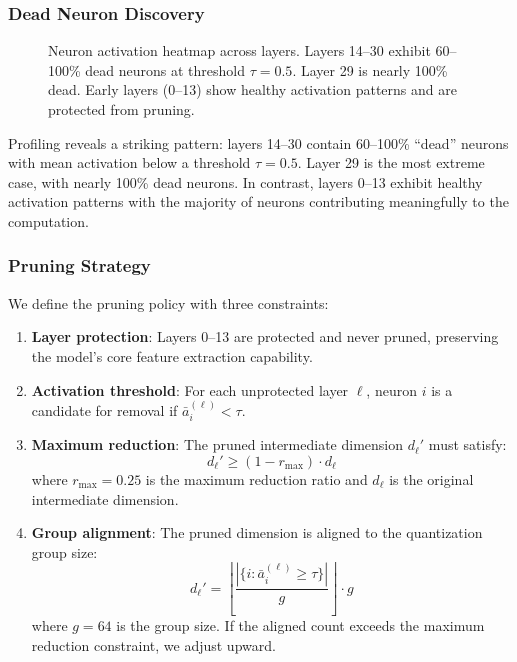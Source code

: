 \documentclass[11pt]{article}
\begin{document}
\subsubsection{Dead Neuron Discovery}

\begin{figure}[t]
    \centering
    \caption{Neuron activation heatmap across layers. Layers 14--30 exhibit 60--100\% dead neurons at threshold $\tau=0.5$. Layer 29 is nearly 100\% dead. Early layers (0--13) show healthy activation patterns and are protected from pruning.}
    \label{fig:activation_heatmap}
\end{figure}

Profiling reveals a striking pattern: layers 14--30 contain 60--100\% ``dead'' neurons with mean activation below a threshold $\tau = 0.5$. Layer 29 is the most extreme case, with nearly 100\% dead neurons. In contrast, layers 0--13 exhibit healthy activation patterns with the majority of neurons contributing meaningfully to the computation.

\subsubsection{Pruning Strategy}

We define the pruning policy with three constraints:

\begin{enumerate}[leftmargin=*]
    \item \textbf{Layer protection}: Layers 0--13 are protected and never pruned, preserving the model's core feature extraction capability.
    \item \textbf{Activation threshold}: For each unprotected layer $\ell$, neuron $i$ is a candidate for removal if $\bar{a}_i^{(\ell)} < \tau$.
    \item \textbf{Maximum reduction}: The pruned intermediate dimension $d_\ell'$ must satisfy:
    \begin{equation}
        d_\ell' \geq (1 - r_{\max}) \cdot d_\ell
    \end{equation}
    where $r_{\max} = 0.25$ is the maximum reduction ratio and $d_\ell$ is the original intermediate dimension.
    \item \textbf{Group alignment}: The pruned dimension is aligned to the quantization group size:
    \begin{equation}
        d_\ell' = \left\lfloor \frac{|\{i : \bar{a}_i^{(\ell)} \geq \tau\}|}{g} \right\rfloor \cdot g
    \end{equation}
    where $g = 64$ is the group size. If the aligned count exceeds the maximum reduction constraint, we adjust upward.
\end{enumerate}
\end{document}
